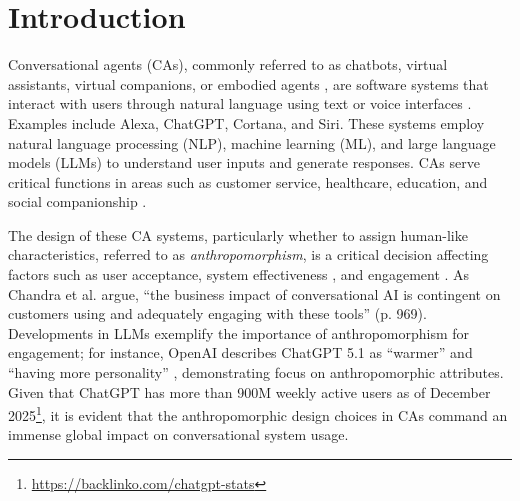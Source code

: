 \documentclass[manuscript,screen,review,anonymous]{acmart}
\begin{document}
\section{Introduction}
\label{sec:introduction}

Conversational agents (CAs), commonly referred to as chatbots, virtual assistants, virtual companions, or embodied agents \citep{klein_effects_2025}, are software systems that interact with users through natural language using text or voice interfaces \citep{diederich_conversational_2019}. Examples include Alexa, ChatGPT, Cortana, and Siri. These systems employ natural language processing (NLP), machine learning (ML), and large language models (LLMs) to understand user inputs and generate responses. CAs serve critical functions in areas such as customer service, healthcare, education, and social companionship \citep{araujo2018living,brandtzaeg2017people}.


The design of these CA systems, particularly whether to assign human-like characteristics, referred to as \textit{anthropomorphism}, is a critical decision affecting factors such as user acceptance, system effectiveness \citep{pfeuffer2019anthropomorphic,ashfaq2020deploying}, and engagement \citep{gong_how_2008}. As Chandra et al. \cite{chandra_be_2022} argue, ``the business impact of conversational AI is contingent on customers using and adequately engaging with these tools'' (p. 969). Developments in LLMs exemplify the importance of anthropomorphism for engagement; for instance, OpenAI describes ChatGPT 5.1 as ``warmer'' and ``having more personality'' \citep{hayden_field_openai_2025}, demonstrating focus on anthropomorphic attributes. Given that ChatGPT has more than 900M weekly active users as of December 2025\footnote{\url{https://backlinko.com/chatgpt-stats}}, it is evident that the anthropomorphic design choices in CAs command an immense global impact on conversational system usage.
\end{document}
